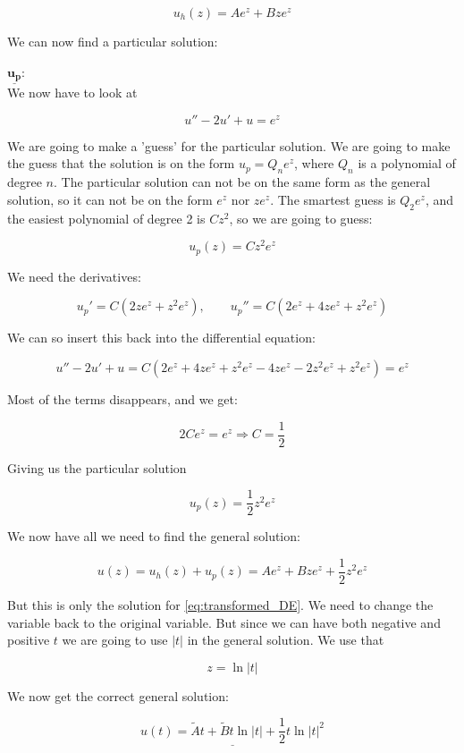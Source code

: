 \documentclass[a4paper,norsk, 10pt]{article}
\begin{document}
\begin{equation}
u_h(z) = Ae^z + Bze^z
\end{equation}

We can now find a particular solution: \\

\newpage

$\underline{\mathbf{u_p}}$:\\

We now have to look at 

$$
u'' - 2u' + u = e^z
$$

We are going to make a 'guess' for the 	particular solution. We are going to make the guess that the solution is on the form $u_p = Q_n e^z$, where $Q_n$ is a polynomial of degree $n$. The particular solution can not be on the same form as the general solution, so it can not be on the form $e^z$ nor $ze^z$. The smartest guess is $Q_2 e^z$, and the easiest polynomial of degree 2 is $Cz^2$, so we are going to guess:

$$
u_p(z) = Cz^2e^z
$$ 

We need the derivatives:

$$
u_p' = C(2ze^z + z^2e^z), \qquad u_p'' = C(2e^z + 4ze^z + z^2e^z)
$$

We can so insert this back into the differential equation:

$$
u'' - 2u' + u = C(2e^z + 4ze^z +z^2e^z - 4ze^z - 2z^2e^z + z^2e^z) = e^z
$$

Most of the terms disappears, and we get:

$$
2Ce^z = e^z \Rightarrow C = \frac{1}{2}
$$

Giving us the particular solution

$$
u_p(z) = \frac{1}{2}z^2 e^z
$$

We now have all we need to find the general solution:

$$
u(z) = u_h(z) + u_p(z) = Ae^z + Bze^z + \frac{1}{2}z^2 e^z
$$

But this is only the solution for \eqref{eq:transformed_DE}. We need to change the variable back to the original variable. But since we can have both negative and positive $t$ we are going to use $|t|$ in the general solution. We use that

$$
z = \ln |t|
$$

We now get the correct general solution:

\begin{equation}
\underline{u(t) = \tilde{A}t + \tilde{B}t\ln |t| + \frac{1}{2}t \ln |t|^2}
\end{equation}
\end{document}
